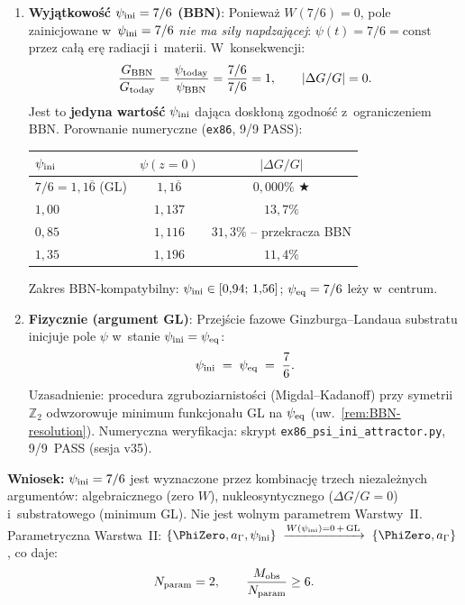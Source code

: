\begin{proposition}[Warunek pocz\k{a}tkowy $\psi_{\rm ini} = 7/6$
  jako Warstwa~I$\to$III --- \statuslabel{Propozycja}]
\begin{enumerate}[nosep]
  \item \textbf{Wyj\k{a}tkowo\'s\'c $\psi_{\rm ini} = 7/6$ (BBN)}:
    Poniewa\.z $W(7/6) = 0$, pole zainicjowane w~$\psi_{\rm ini} = 7/6$
    \emph{nie ma si\l{}y napdzaj\k{a}cej}: $\psi(t) = 7/6 = \mathrm{const}$
    przez ca\l\k{a} er\k{e} radiacji i~materii.
    W~konsekwencji:
    \[
      \frac{G_{\rm BBN}}{G_{\rm today}}
      = \frac{\psi_{\rm today}}{\psi_{\rm BBN}}
      = \frac{7/6}{7/6} = 1,
      \qquad |\Delta G/G| = 0.
    \]
    Jest to \textbf{jedyna warto\'s\'c} $\psi_{\rm ini}$
    daj\k{a}ca dosk\l{}on\k{a} zgodno\'s\'c z~ograniczeniem BBN.
    Porownanie numeryczne (\texttt{ex86}, 9/9 PASS):
    \begin{center}\small
    \begin{tabular}{lcc}
      \hline
      $\psi_{\rm ini}$ & $\psi(z{=}0)$ & $|\Delta G/G|$ \\
      \hline
      $7/6 = 1{,}1\overline{6}$ (GL) & $1{,}1\overline{6}$ & $0{,}000\%$ ★ \\
      $1{,}00$ & $1{,}137$ & $13{,}7\%$ \\
      $0{,}85$ & $1{,}116$ & $31{,}3\%$ -- przekracza BBN \\
      $1{,}35$ & $1{,}196$ & $11{,}4\%$ \\
      \hline
    \end{tabular}
    \end{center}
    Zakres BBN-kompatybilny: $\psi_{\rm ini} \in [0{,}94;\,1{,}56]$;
    $\psi_{\rm eq} = 7/6$ le\.zy w~centrum.

  \item \textbf{Fizycznie (argument GL)}:
    Przej\'scie fazowe Ginzburga--Landaua substratu inicjuje pole
    $\psi$ w~stanie $\psi_{\rm ini} = \psi_{\rm eq}$:
    \begin{equation}\label{eq:psi-ini-GL}
      \psi_{\rm ini} \;=\; \psi_{\rm eq} \;=\; \frac{7}{6}.
    \end{equation}
    Uzasadnienie: procedura zgruboziarnisto\'sci (Migdal--Kadanoff)
    przy symetrii $\mathbb{Z}_2$ odwzorowuje minimum funkcjona\l{}u GL
    na $\psi_{\rm eq}$ (uw.~\ref{rem:BBN-resolution}).
    Numeryczna weryfikacja: skrypt \texttt{ex86\_psi\_ini\_attractor.py},
    9/9~PASS (sesja v35).
\end{enumerate}
\textbf{Wniosek:} $\psi_{\rm ini} = 7/6$ jest wyznaczone przez
kombinacj\k{e} trzech niezale\.znych argument\'ow:
algebraicznego (zero $W$), nukleosyntycznego ($\Delta G/G = 0$)
i~substratowego (minimum GL). Nie jest wolnym parametrem
Warstwy~II.
Parametryczna Warstwa~II:
$\{\PhiZero, a_\Gamma, \psi_{\rm ini}\}
\;\xrightarrow{W(\psi_{\rm ini})=0\,+\,\mathrm{GL}}\;
\{\PhiZero, a_\Gamma\}$, co daje:
\begin{equation}\label{eq:parsimony-2}
  N_{\rm param} = 2, \qquad
  \frac{M_{\rm obs}}{N_{\rm param}} \geq 6.
\end{equation}
\end{proposition}

